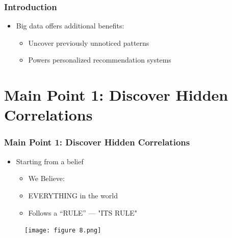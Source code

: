 \documentclass{beamer}
\begin{document}
\begin{frame}
 \frametitle{Introduction}
\begin{minipage}{\textwidth}
{\linespread{2}
\begin{itemize}
    \item {\LARGE Big data offers additional benefits:}
    \begin{itemize}
        \item <1-> {\large Uncover previously unnoticed patterns}
        \item <2-> {\large Powers personalized recommendation systems}
    \end{itemize}
\end{itemize}
}
\end{minipage}
\end{frame}



\section{Main Point 1: Discover Hidden Correlations}
\begin{frame}
 \frametitle{Main Point 1: Discover Hidden Correlations}
\begin{minipage}{\textwidth}
{\linespread{1.3}
\begin{itemize}
    \item {\Large Starting from a belief}
    \begin{itemize}
        \item {\large We Believe:}
        \item {\large EVERYTHING in the world}
        \item {\large Follows a “RULE” --- "ITS RULE"}
    \end{itemize}
\end{itemize}
}
\begin{figure}
    \centering
    \texttt{[image: figure 8.png]}
    \label{fig:enter-label}
\end{figure}
\end{minipage}
\end{frame}
\end{document}
